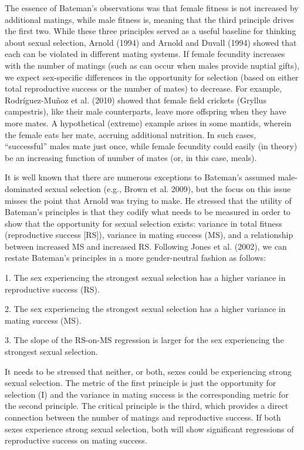 \documentclass{article}
\begin{document}
The essence of Bateman’s observations was that female fitness is not increased by additional matings, while male fitness is, meaning that the third principle drives the first two. While these three principles served as a useful baseline for thinking about sexual selection, Arnold (1994) and Arnold and Duvall (1994) showed that each can be violated in different mating systems. If female fecundity increases with the number of matings (such as can occur when males provide nuptial gifts), we expect sex-specific differences in the opportunity for selection (based on either total reproductive success or the number of mates) to decrease. For example, Rodríguez-Muñoz et al. (2010) showed that female field crickets (Gryllus campestris), like their male counterparts, leave more offspring when they have more mates. A hypothetical (extreme) example arises in some mantids, wherein the female eats her mate, accruing additional nutrition. In such cases, “successful” males mate just once, while female fecundity could easily (in theory) be an increasing function of number of mates (or, in this case, meals).

It is well known that there are numerous exceptions to Bateman's assumed male-dominated sexual selection (e.g., Brown et al. 2009), but the focus on this issue misses the point that Arnold was trying to make. He stressed that the utility of Bateman's principles is that they codify what needs to be measured in order to show that the opportunity for sexual selection exists: variance in total fitness (reproductive success [RS]), variance in mating success (MS), and a relationship between increased MS and increased RS. Following Jones et al. (2002), we can restate Bateman's principles in a more gender-neutral fashion as follows:

1. The sex experiencing the strongest sexual selection has a higher variance in reproductive success (RS).

2. The sex experiencing the strongest sexual selection has a higher variance in mating success (MS).

3. The slope of the RS-on-MS regression is larger for the sex experiencing the strongest sexual selection.

It needs to be stressed that neither, or both, sexes could be experiencing strong sexual selection. The metric of the first principle is just the opportunity for selection (I) and the variance in mating success is the corresponding metric for the second principle. The critical principle is the third, which provides a direct connection between the number of matings and reproductive success. If both sexes experience strong sexual selection, both will show significant regressions of reproductive success on mating success.
\end{document}
